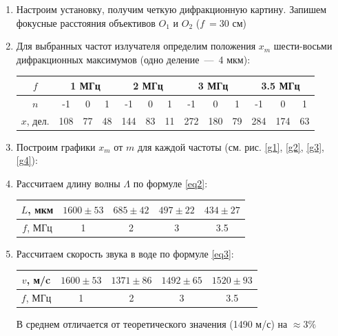 \documentclass[a4paper, 12pt]{article}
\begin{document}
    \begin{enumerate}
        \item Настроим установку, получим четкую дифракционную картину. Запишем фокусные расстояния объективов $O_1$ и $O_2$ ($f~=30$ см)
        \item Для выбранных частот излучателя определим положения $x_m$ шести-восьми дифракционных максимумов (одно деление~---~4 мкм):
        
            \begin{tabular}{|c|c|c|c|c|c|c|c|c|c|c|c|c|} \hline
                $f$ & \multicolumn{3}{|c|}{1 МГц} & \multicolumn{3}{|c|}{2 МГц} & \multicolumn{3}{|c|}{3 МГц} & \multicolumn{3}{|c|}{3.5 МГц}\\ \hline
                $n$ & -1 & 0 & 1 & -1 & 0 & 1 & -1 & 0 & 1 & -1 & 0 & 1 \\ \hline
                $x$, дел. & 108 & 77 & 48 & 144 & 83 & 11 & 272 & 180 & 79 & 284 & 174 & 63 \\ \hline
            \end{tabular}

        \item Построим графики $x_m$ от $m$ для каждой частоты (см. рис. \ref{g1}, \ref{g2}, \ref{g3}, \ref{g4}):

        \item Рассчитаем длину волны $\Lambda$ по формуле \ref{eq2}:
        
            \begin{tabular}{|c|c|c|c|c|} \hline
                $L$, мкм & $1600 \pm 53$ & $685 \pm 42$ & $497 \pm 22$ & $434 \pm 27$ \\ \hline
                $f$, МГц & 1 & 2 & 3 & 3.5 \\ \hline
            \end{tabular}

        \item Рассчитаем скорость звука в воде по формуле \ref{eq3}:
            
            \begin{tabular}{|c|c|c|c|c|} \hline
                $v$, м/c & $1600 \pm 53$ & $1371 \pm 86$ & $1492 \pm 65$ & $1520 \pm 93$ \\ \hline
                $f$, МГц & 1 & 2 & 3 & 3.5 \\ \hline
            \end{tabular}

            В среднем отличается от теоретического значения (1490 м/с) на $\approx 3\%$


\end{enumerate}
\end{document}
